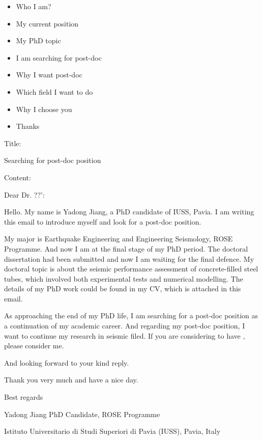 \documentclass[a4paper]{article}
\begin{document}
\begin{itemize}
	\item Who I am?
	\item My current position
	\item My PhD topic
	\item I am searching for post-doc
	\item Why I want post-doc
	\item Which field I want to do
	\item Why I choose you
	\item Thanks
\end{itemize}




Title:

Searching for post-doc position

Content:

Dear Dr. ??':

Hello. My name is Yadong Jiang, a PhD candidate of IUSS, Pavia. I am writing this email to introduce myself and look for a post-doc position.

My major is Earthquake Engineering and Engineering Seismology, ROSE Programme. And now I am at the final stage of my PhD period. The doctoral dissertation had been submitted and now I am waiting for the final defence. My doctoral topic is about the seismic performance assessment of concrete-filled steel tubes, which involved both experimental tests and numerical modelling. The details of my PhD work could be found in my CV, which is attached in this email. 

As approaching the end of my PhD life, I am searching for a post-doc position as a continuation of my academic career. And regarding my post-doc position, I want to continue my research in seismic filed. If you are considering to have , please consider me. 

And looking forward to your kind reply.

Thank you very much and have a nice day.

Best regards

Yadong Jiang
PhD Candidate, ROSE Programme

Istituto Universitario di Studi Superiori di Pavia (IUSS), Pavia, Italy
\end{document}
